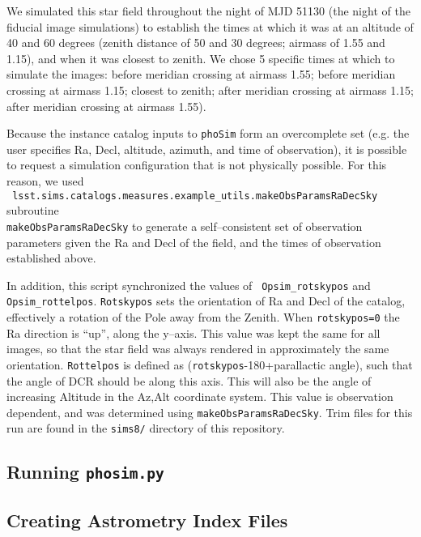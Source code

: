 \documentclass[prd, nofootinbib, floatfix, 11pt, tightenlines, times]{article}
\begin{document}
\begin{appendices}
We simulated this star field throughout the night of MJD 51130 (the
night of the fiducial image simulations) to establish the times at
which it was at an altitude of 40 and 60 degrees (zenith distance of
50 and 30 degrees; airmass of 1.55 and 1.15), and when it was closest
to zenith.  We chose 5 specific times at which to simulate the images:
before meridian crossing at airmass 1.55; before meridian crossing at
airmass 1.15; closest to zenith; after meridian crossing at airmass
1.15; after meridian crossing at airmass 1.55).

Because the instance catalog inputs to {\tt phoSim} form an
overcomplete set (e.g. the user specifies Ra, Decl, altitude, azimuth,
and time of observation), it is possible to request a simulation
configuration that is not physically possible.  For this reason, we
used \\{\tt
  lsst.sims.catalogs.measures.example\_utils.makeObsParamsRaDecSky}
subroutine \\{\tt makeObsParamsRaDecSky} to generate a self--consistent
set of observation parameters given the Ra and Decl of the field, and
the times of observation established above.

In addition, this script synchronized the values of {\tt
  Opsim\_rotskypos} and {\tt Opsim\_rottelpos}.  {\tt Rotskypos} sets
the orientation of Ra and Decl of the catalog, effectively a rotation
of the Pole away from the Zenith.  When {\tt rotskypos=0} the Ra
direction is ``up'', along the y--axis.  This value was kept the same
for all images, so that the star field was always rendered in
approximately the same orientation.  {\tt Rottelpos} is defined as
({\tt rotskypos}-180+parallactic angle), such that the angle of DCR
should be along this axis.  This will also be the angle of increasing
Altitude in the Az,Alt coordinate system.  This value is observation
dependent, and was determined using {\tt makeObsParamsRaDecSky}.  Trim
files for this run are found in the {\tt sims8/} directory of this
repository.

\subsection{Running {\tt phosim.py}}

\subsection{Creating Astrometry Index Files}


\end{appendices}
\end{document}

